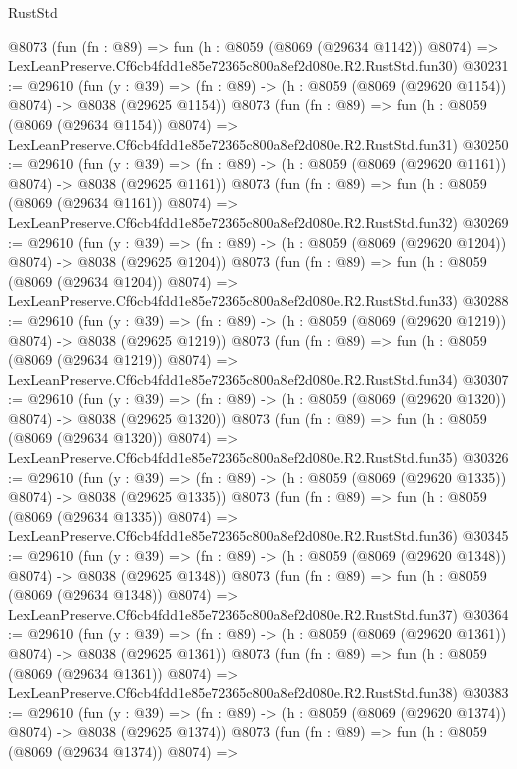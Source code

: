 \begin{lexlean}{RustStd}
\begin{coremodule}
    @8073
    (fun (fn : @89) =>
    fun (h : @8059 (@8069 (@29634 @1142)) @8074) =>
    LexLeanPreserve.Cf6cb4fdd1e85e72365c800a8ef2d080e.R2.RustStd.fun30)
@30231 := @29610
    (fun (y : @39) =>
    (fn : @89) -> (h : @8059 (@8069 (@29620 @1154)) @8074) -> @8038 (@29625 @1154))
    @8073
    (fun (fn : @89) =>
    fun (h : @8059 (@8069 (@29634 @1154)) @8074) =>
    LexLeanPreserve.Cf6cb4fdd1e85e72365c800a8ef2d080e.R2.RustStd.fun31)
@30250 := @29610
    (fun (y : @39) =>
    (fn : @89) -> (h : @8059 (@8069 (@29620 @1161)) @8074) -> @8038 (@29625 @1161))
    @8073
    (fun (fn : @89) =>
    fun (h : @8059 (@8069 (@29634 @1161)) @8074) =>
    LexLeanPreserve.Cf6cb4fdd1e85e72365c800a8ef2d080e.R2.RustStd.fun32)
@30269 := @29610
    (fun (y : @39) =>
    (fn : @89) -> (h : @8059 (@8069 (@29620 @1204)) @8074) -> @8038 (@29625 @1204))
    @8073
    (fun (fn : @89) =>
    fun (h : @8059 (@8069 (@29634 @1204)) @8074) =>
    LexLeanPreserve.Cf6cb4fdd1e85e72365c800a8ef2d080e.R2.RustStd.fun33)
@30288 := @29610
    (fun (y : @39) =>
    (fn : @89) -> (h : @8059 (@8069 (@29620 @1219)) @8074) -> @8038 (@29625 @1219))
    @8073
    (fun (fn : @89) =>
    fun (h : @8059 (@8069 (@29634 @1219)) @8074) =>
    LexLeanPreserve.Cf6cb4fdd1e85e72365c800a8ef2d080e.R2.RustStd.fun34)
@30307 := @29610
    (fun (y : @39) =>
    (fn : @89) -> (h : @8059 (@8069 (@29620 @1320)) @8074) -> @8038 (@29625 @1320))
    @8073
    (fun (fn : @89) =>
    fun (h : @8059 (@8069 (@29634 @1320)) @8074) =>
    LexLeanPreserve.Cf6cb4fdd1e85e72365c800a8ef2d080e.R2.RustStd.fun35)
@30326 := @29610
    (fun (y : @39) =>
    (fn : @89) -> (h : @8059 (@8069 (@29620 @1335)) @8074) -> @8038 (@29625 @1335))
    @8073
    (fun (fn : @89) =>
    fun (h : @8059 (@8069 (@29634 @1335)) @8074) =>
    LexLeanPreserve.Cf6cb4fdd1e85e72365c800a8ef2d080e.R2.RustStd.fun36)
@30345 := @29610
    (fun (y : @39) =>
    (fn : @89) -> (h : @8059 (@8069 (@29620 @1348)) @8074) -> @8038 (@29625 @1348))
    @8073
    (fun (fn : @89) =>
    fun (h : @8059 (@8069 (@29634 @1348)) @8074) =>
    LexLeanPreserve.Cf6cb4fdd1e85e72365c800a8ef2d080e.R2.RustStd.fun37)
@30364 := @29610
    (fun (y : @39) =>
    (fn : @89) -> (h : @8059 (@8069 (@29620 @1361)) @8074) -> @8038 (@29625 @1361))
    @8073
    (fun (fn : @89) =>
    fun (h : @8059 (@8069 (@29634 @1361)) @8074) =>
    LexLeanPreserve.Cf6cb4fdd1e85e72365c800a8ef2d080e.R2.RustStd.fun38)
@30383 := @29610
    (fun (y : @39) =>
    (fn : @89) -> (h : @8059 (@8069 (@29620 @1374)) @8074) -> @8038 (@29625 @1374))
    @8073
    (fun (fn : @89) =>
    fun (h : @8059 (@8069 (@29634 @1374)) @8074) =>

\end{coremodule}
\end{lexlean}
